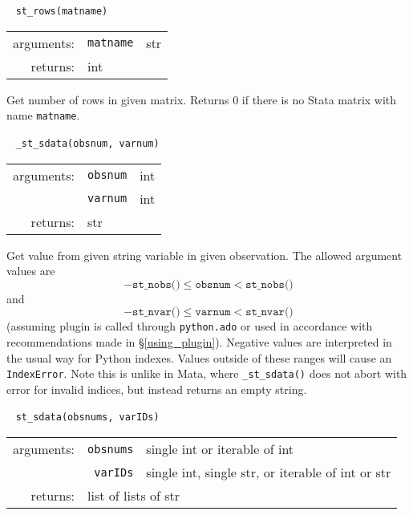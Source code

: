 \documentclass{article}
\begin{document}
			
			\ \newline
			\noindent \lstinline$st_rows(matname)$
								
			\vspace{1.5mm}
			\noindent 
			\indent \begin{tabular}{rrl}
					arguments: & \texttt{matname} & str \\
					returns: & \multicolumn{2}{l}{int}
				\end{tabular}
								
			\vspace{1.5mm}
			\noindent Get number of rows in given matrix. Returns 0 if there is no Stata matrix with name \lstinline$matname$. \newline
			
			
			\ \newline
			\noindent \lstinline$_st_sdata(obsnum, varnum)$
								
			\vspace{1.5mm}
			\noindent 
			\indent \begin{tabular}{rrl}
					arguments: & \texttt{obsnum} & int \\
						& \texttt{varnum} & int \\
					returns: & \multicolumn{2}{l}{str}
				\end{tabular}
								
			\vspace{1.5mm}
			\noindent Get value from given string variable in given observation. The allowed argument values are 
			\[
				-\texttt{st\_nobs()} \leq \texttt{obsnum} < \texttt{st\_nobs()}
			\]
			and
			\[
				-\texttt{st\_nvar()} \leq \texttt{varnum} < \texttt{st\_nvar()}
			\]
			(assuming plugin is called through \lstinline$python.ado$ or used in accordance with recommendations made in \S\ref{using_plugin}). Negative values are interpreted in the usual way for Python indexes. Values outside of these ranges will cause an \lstinline$IndexError$. Note this is unlike in Mata, where \lstinline{_st_sdata()} does not abort with error for invalid indices, but instead returns an empty string. \newline
			
			
			\ \newline
			\noindent \lstinline$st_sdata(obsnums, varIDs)$
								
			\vspace{1.5mm}
			\noindent 
			\indent \begin{tabular}{rrl}
					arguments: & \texttt{obsnums} & single int or iterable of int \\
						& \texttt{varIDs} & single int, single str, or iterable of int or str \\
					returns: & \multicolumn{2}{l}{list of lists of str}
				\end{tabular}
								
\end{document}
